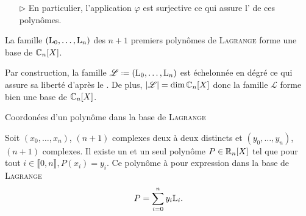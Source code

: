 \begin{preuve}
\begin{itemize}
\begin{itemize}
        \item[$\rhd$] En particulier, l'application $\varphi$ est surjective ce qui assure l' de ces polynômes. 
    \end{itemize}
\end{itemize}
\end{preuve}

\begin{prop}
    La famille $(\mathrm{L}_0, \dots, \mathrm{L}_n)$ des $n+1$ premiers polynômes de \textsc{Lagrange} forme une base de $\mathbb{C}_n[X]$.
\end{prop}

\begin{preuve} 
    Par construction, la famille $\mathscr{L} \defeq (\Lag_0, \dots, \Lag_n)$ est échelonnée en dégré ce qui assure sa liberté d'après le . De plus, $|\mathscr{L}| = \dim \mathbb{C}_n[X]$ donc la famille $\mathscr{L}$ forme bien une base de $\mathbb{C}_n[X]$.
\end{preuve}

Coordonées d'un polynôme dans la base de \textsc{Lagrange}

\begin{prop}
Soit $(x_0, \dots, x_n)$, $(n+1)$ complexes deux à deux distincts et $(y_0, \dots, y_n)$, $(n+1)$ complexes. Il existe un et un seul polynôme $P \in \mathbb{R}_n[X]$ tel que pour tout $i \in \llbracket 0, n \rrbracket, P(x_i) = y_i$. Ce polynôme à pour expression dans la base de \textsc{Lagrange}
$$P = \sum_{i=0}^n y_i \mathrm{L}_i.$$
\end{prop}